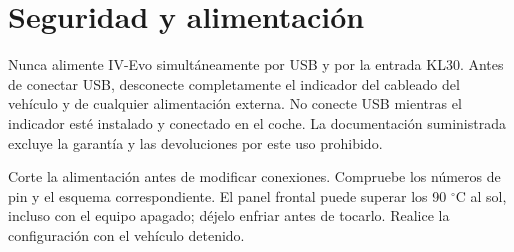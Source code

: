 \chapter{Seguridad y alimentación}
Nunca alimente IV-Evo simultáneamente por USB y por la entrada KL30. Antes de conectar USB, desconecte completamente el indicador del cableado del vehículo y de cualquier alimentación externa. No conecte USB mientras el indicador esté instalado y conectado en el coche. La documentación suministrada excluye la garantía y las devoluciones por este uso prohibido.

Corte la alimentación antes de modificar conexiones. Compruebe los números de pin y el esquema correspondiente. El panel frontal puede superar los 90 $^\circ$C al sol, incluso con el equipo apagado; déjelo enfriar antes de tocarlo. Realice la configuración con el vehículo detenido.
